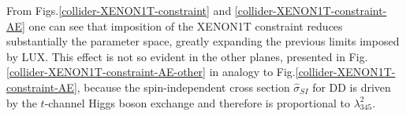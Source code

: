 %
From Figs.\ref{collider-XENON1T-constraint} and \ref{collider-XENON1T-constraint-AE}
one can see  that imposition of the XENON1T constraint reduces substantially the parameter space, greatly expanding the previous limits imposed by LUX. This effect is not so evident in the other planes, presented in Fig.\ref{collider-XENON1T-constraint-AE-other}
in analogy to Fig.\ref{collider-XENON1T-constraint-AE},
because the spin-independent cross section $\hat{\sigma}_{SI}$ for DD is driven by the $t$-channel Higgs boson exchange 
and therefore is proportional to $\lambda_{345}^2$.
\begin{figure}[htb]
%
\\
%

\end{figure}
